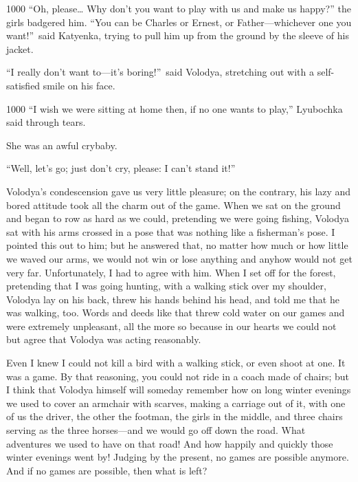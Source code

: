 \begin{tolerant}{1000}
``Oh, please\ldots{} Why don't you want to play with us and make us happy?'' the girls badgered him. ``You can be Charles or Ernest, or Father---whichever one you want!''~said Katyenka, trying to pull him up from the ground by the sleeve of his jacket. %
\end{tolerant}

``I really don't want to---it's boring!''~said Volodya, stretching out with a self-satisfied smile on his face.

\begin{tolerant}{1000}
``I wish we were sitting at home then, if no one wants to play,'' Lyubochka said through tears. %
\end{tolerant}

She was an awful crybaby.

``Well, let's go; just don't cry, please: I can't stand it!'' %

Volodya's condescension gave us very little pleasure; on the contrary, his lazy and bored attitude took all the charm out of the game. When we sat on the ground and began to row as hard as we could, pretending we were going fishing, Volodya sat with his arms crossed in a pose that was nothing like a fisherman's pose. I pointed this out to him; but he answered that, no matter how much or how little we waved our arms, we would not win or lose anything and anyhow would not get very far. Unfortunately, I had to agree with him. When I set off for the forest, pretending that I was going hunting, with a walking stick over my shoulder, Volodya lay on his back, threw his hands behind his head, and told me that he was walking, too. Words and deeds like that threw cold water on our games and were extremely unpleasant, all the more so because in our hearts we could not but agree that Volodya was acting reasonably.

Even I knew I could not kill a bird with a walking stick, or even shoot at one. It was a game. By that reasoning, you could not ride in a coach made of chairs; but I think that Volodya himself will someday remember how on long winter evenings we used to cover an armchair with scarves, making a carriage out of it, with one of us the driver, the other the footman, the girls in the middle, and three chairs serving as the three horses---and we would go off down the road. What adventures we used to have on that road! And how happily and quickly those winter evenings went by! Judging by the present, no games are possible anymore. And if no games are possible, then what is left?


